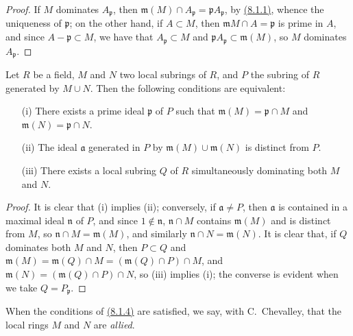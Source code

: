 \begin{proof}
\label{proof-lem-1.8.1.3}
If $M$ dominates $A_\mathfrak{p}$, then
$\mathfrak{m}(M)\cap A_\mathfrak{p}=\mathfrak{p}A_\mathfrak{p}$,
by \hyperref[lem-1.8.1.1]{(8.1.1)}, whence the uniqueness of $\mathfrak{p}$; on the other hand,
if $A\subset M$, then $\mathfrak{m}M\cap A=\mathfrak{p}$ is prime in $A$, and since
$A-\mathfrak{p}\subset M$, we have that $A_\mathfrak{p}\subset M$ and
$\mathfrak{p}A_\mathfrak{p}\subset\mathfrak{m}(M)$, so $M$ dominates
$A_\mathfrak{p}$.
\end{proof}

\begin{lem}[8.1.4]
\label{lem-1.8.1.4}
Let $R$ be a field, $M$ and $N$ two local
subrings of $R$, and $P$ the subring of $R$ generated by $M\cup N$. Then the
following conditions are equivalent:
\begin{itemize}
  \item[{\rm(i)}] There exists a prime ideal $\mathfrak{p}$ of $P$ such that
        $\mathfrak{m}(M)=\mathfrak{p}\cap M$ and $\mathfrak{m}(N)=\mathfrak{p}\cap N$.
  \item[{\rm(ii)}] The ideal $\mathfrak{a}$ generated in $P$ by $\mathfrak{m}(M)\cup\mathfrak{m}(N)$ is
        distinct from $P$.
  \item[{\rm(iii)}] There exists a local subring $Q$ of $R$ simultaneously dominating both $M$ and $N$.
\end{itemize}
\end{lem}

\begin{proof}
\label{proof-lem-1.8.1.4}
It is clear that (i) implies (ii); conversely, if $\mathfrak{a}\neq P$, then
$\mathfrak{a}$ is contained in a maximal ideal $\mathfrak{n}$ of $P$, and since
$1\not\in\mathfrak{n}$, $\mathfrak{n}\cap M$ contains $\mathfrak{m}(M)$ and is
distinct from $M$, so $\mathfrak{n}\cap M=\mathfrak{m}(M)$, and similarly
$\mathfrak{n}\cap N=\mathfrak{m}(N)$. It is clear that, if $Q$ dominates both
$M$ and $N$, then $P\subset Q$ and
$\mathfrak{m}(M)=\mathfrak{m}(Q)\cap M=(\mathfrak{m}(Q)\cap P)\cap M$, and
$\mathfrak{m}(N)=(\mathfrak{m}(Q)\cap P)\cap N$, so (iii) implies (i); the converse
is evident when we take $Q=P_\mathfrak{p}$.
\end{proof}

When the conditions of \hyperref[lem-1.8.1.4]{(8.1.4)} are satisfied, we say, with C.~Chevalley,
that the local rings $M$ and $N$ are {\it allied}.


